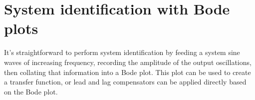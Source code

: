 \section{System identification with Bode plots}

It's straightforward to perform system identification by feeding a system sine
waves of increasing frequency, recording the amplitude of the output
oscillations, then collating that information into a Bode plot. This plot can be
used to create a transfer function, or lead and lag compensators can be applied
directly based on the Bode plot.
